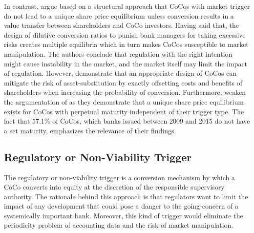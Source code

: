 In contrast, \citet{sundaresan2015design} argue based on a structural approach that CoCos with market trigger do not lead to a unique share price equilibrium unless conversion results in a value transfer between shareholders and CoCo investors. Having said that, the design of dilutive conversion ratios to punish bank managers for taking excessive risks creates multiple equilibria which in turn makes CoCos susceptible to market manipulation. The authors conclude that regulation with the right intention might cause instability in the market, and the market itself may limit the impact of regulation. However, \citet{hilscher2014bank} demonstrate that an appropriate design of CoCos can mitigate the risk of asset-substitution by exactly offsetting costs and benefits of shareholders when increasing the probability of conversion. Furthermore, \citet{pennacchi2015reexamination} weaken the argumentation of \citet{sundaresan2015design} as they demonstrate that a unique share price equilibrium exists for CoCos with perpetual maturity independent of their trigger type. The fact that 57.1\% of CoCos, which banks issued between 2009 and 2015 do not have a set maturity, emphasizes the relevance of their findings. \citep{europeanparliament2016}


\subsection{Regulatory or Non-Viability Trigger} \label{regulatorytrigger}

The regulatory or non-viability trigger is a conversion mechanism by which a CoCo converts into equity at the discretion of the responsible supervisory authority. The rationale behind this approach is that regulators want to limit the impact of any development that could pose a danger to the going-concern of a systemically important bank. \citep{erismann2015pricing} Moreover, this kind of trigger would eliminate the periodicity problem of accounting data and the risk of market manipulation.\\ 

